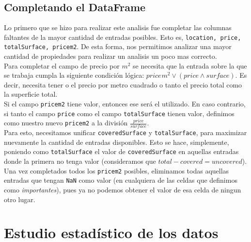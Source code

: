 \documentclass[a4paper, 10pt]{article}
\def\code#1{\texttt{#1}}
\newcommand\tab[1][0.5cm]{\hspace*{#1}}
\begin{document}
			\subsection{Completando el DataFrame}
				Lo primero que se hizo para realizar este analisis fue completar las columnas faltantes
				de la mayor cantidad de entradas posibles. Esto es, \code{location, price, totalSurface,
				pricem2}. De esta forma, nos permitimos analizar una mayor cantidad de propiedades
				para realizar un analisis un poco mas correcto. \\
				\tab Para completar el campo de precio por $m^2$ se necesita que la entrada sobre la que
				se trabaja cumpla la siguiente condición lógica: $price_{}m^2 \vee (price \wedge surface)$. Es
				decir, necesita tener o el precio por metro cuadrado o tanto el precio total como la superficie
				total. \\
				\tab Si el campo \code{pricem2} tiene valor, entonces ese será el utilizado. En caso contrario,
				si tanto el campo \code{price} como el campo \code{totalSurface} tienen valor, definimos como
				nuestro nuevo \code{pricem2} a la división $\frac{price}{surface}$. \\
				\tab Para esto, necesitamos unificar \code{coveredSurface} y \code{totalSurface}, para maximizar
				nuevamente la cantidad de entradas disponibles. Esto se hace, simplemente, poniendo como
				\code{totalSurface} el valor de \code{coveredSurface} en aquellas entradas donde la primera
				no tenga valor (consideramos que $total - covered = uncovered$). \\
				\tab Una vez completados todos los \code{pricem2} posibles, eliminamos todas aquellas entradas
				que tengan \code{NaN} como valor (en cualquiera de las celdas que definimos como \emph{importantes}),
				pues ya no podemos obtener el valor de esa celda de ningun otro lugar.
		\section{Estudio estadístico de los datos}
\end{document}
